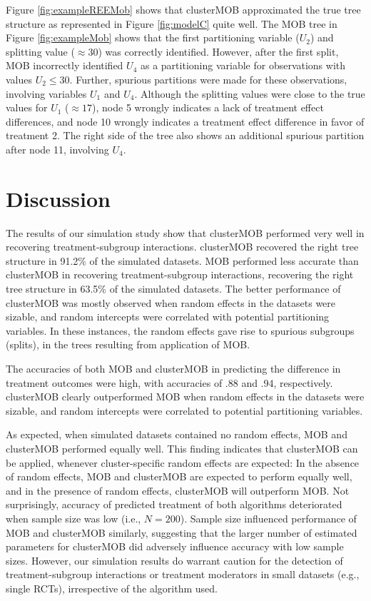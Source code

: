 \documentclass[nobf,man]{apa}
\begin{document}
Figure \ref{fig:exampleREEMob} shows that clusterMOB approximated the true tree structure as represented in Figure \ref{fig:modelC} quite well. The MOB tree in Figure \ref{fig:exampleMob} shows that the first partitioning variable ($U_2$) and splitting value ($\approx 30$) was correctly identified. However, after the first split, MOB incorrectly identified $U_4$ as a partitioning variable for observations with values $U_2 \leq 30$. Further, spurious partitions were made for these observations, involving variables $U_1$ and $U_4$. Although the splitting values were close to the true values for $U_1$ ($\approx 17$), node 5 wrongly indicates a lack of treatment effect differences, and node 10 wrongly indicates a treatment effect difference in favor of treatment 2. The right side of the tree also shows an additional spurious partition after node 11, involving $U_4$.



\section{Discussion}

The results of our simulation study show that clusterMOB performed very well in recovering treatment-subgroup interactions. clusterMOB recovered the right tree structure in 91.2\% of the simulated datasets. MOB performed less accurate than clusterMOB in recovering treatment-subgroup interactions, recovering the right tree structure in 63.5\% of the simulated datasets. The better performance of clusterMOB was mostly observed when random effects in the datasets were sizable, and random intercepts were correlated with potential partitioning variables. In these instances, the random effects gave rise to spurious subgroups (splits), in the trees resulting from application of MOB. 

The accuracies of both MOB and clusterMOB in predicting the difference in treatment outcomes were high, with accuracies of .88 and .94, respectively. clusterMOB clearly outperformed MOB when random effects in the datasets were sizable, and random intercepts were correlated to potential partitioning variables.

As expected, when simulated datasets contained no random effects, MOB and clusterMOB performed equally well. This finding indicates that clusterMOB can be applied, whenever cluster-specific random effects are expected: In the absence of random effects, MOB and clusterMOB are expected to perform equally well, and in the presence of random effects, clusterMOB will outperform MOB. Not surprisingly, accuracy of predicted treatment of both algorithms deteriorated when sample size was low (i.e., $N=200$). Sample size influenced performance of MOB and clusterMOB similarly, suggesting that the larger number of estimated parameters for clusterMOB did adversely influence accuracy with low sample sizes. However, our simulation results do warrant caution for the detection of treatment-subgroup interactions or treatment moderators in small datasets (e.g., single RCTs), irrespective of the algorithm used.
\end{document}
